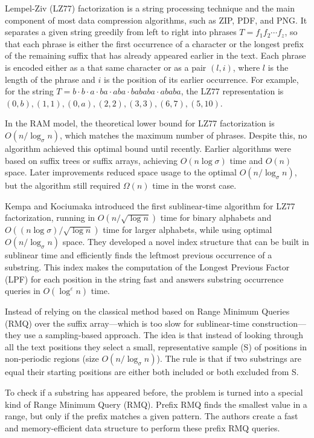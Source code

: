 Lempel-Ziv (LZ77) factorization is a string processing technique and the main component of most data compression algorithms, such as ZIP, PDF, and PNG. It separates a given string greedily from left to right into phrases \break \( T = f_1 f_2 \cdots f_z \), so that each phrase is either the first occurrence of a character or the longest prefix of the remaining suffix that has already appeared earlier in the text. Each phrase is encoded either as a that same character or as a pair \((l, i)\), where \(l\) is the length of the phrase and \(i\) is the position of its earlier occurrence. For example, for the string \( T = b \cdot b \cdot a \cdot ba \cdot aba \cdot bababa \cdot ababa \), the LZ77 representation is \((0, b), (1,1), (0, a), (2,2), (3,3), (6, 7), (5, 10)\).

In the RAM model, the theoretical lower bound for LZ77 factorization is \( O(n / \log_{\sigma} n) \), which matches the maximum number of phrases. Despite this, no algorithm achieved this optimal bound until recently.
Earlier algorithms were based on suffix trees or suffix arrays, achieving \( O(n \log \sigma) \) time and \( O(n) \) space. Later improvements reduced space usage to the optimal \( O(n / \log_{\sigma} n) \), but the algorithm still required \(\Omega (n)\) time in the worst case.

Kempa and Kociumaka introduced the first sublinear-time algorithm for LZ77 factorization, running in \( O(n / \sqrt{\log n}) \) time for binary alphabets and \break \( O((n \log \sigma) / \sqrt{\log n}) \) time for larger alphabets, while using optimal \( O(n / \log_{\sigma} n) \) space. They developed a novel index structure that can be built in sublinear time and efficiently finds the leftmost previous occurrence of a substring. This index makes the computation of the Longest Previous Factor (LPF) for each position in the string fast and answers substring occurrence queries in \( O(\log^{\varepsilon} n) \) time.

Instead of relying on the classical method based on Range Minimum Queries (RMQ) over the suffix array—which is too slow for sublinear-time construction—they use a sampling-based approach. The idea is that instead of looking through all the text positions they select a small, representative sample (S) of positions in non-periodic regions (size \(O(n / \log_{\sigma} n)\)). The rule is that if two substrings are equal their starting positions are either both included or both excluded from S.

To check if a substring has appeared before, the problem is turned into a special kind of Range Minimum Query (RMQ). Prefix RMQ finds the smallest value in a range, but only if the prefix matches a given pattern. The authors create a fast and memory-efficient data structure to perform these prefix RMQ queries.

